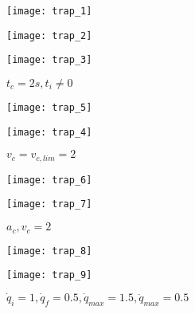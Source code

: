 \begin{figure}
\begin{minipage}{0.333\textwidth}
\centering
\texttt{[image: trap\_1]}
\caption{$t_c=2s$}
\label{fig:trap_1}
\end{minipage}
\begin{minipage}{0.333\textwidth}
\centering
\texttt{[image: trap\_2]}
\caption{$t_c=2s, q_i>q_f$}
\label{fig:trap_2}
\end{minipage}
\begin{minipage}{0.333\textwidth}
\centering
\texttt{[image: trap\_3]}
\caption{$t_c=2s, t_i\neq 0$}
\label{fig:trap_3}
\end{minipage}
\end{figure}

\begin{figure}
\begin{minipage}{0.5\textwidth}
\centering
\texttt{[image: trap\_5]}
\caption{$v_c=1.5$}
\label{fig:trap_5}
\end{minipage}
\begin{minipage}{0.5\textwidth}
\centering
\texttt{[image: trap\_4]}
\caption{$v_c=v_{c,lim}=2$}
\label{fig:trap_4}
\end{minipage}
\end{figure}

\begin{figure}
\begin{minipage}{0.5\textwidth}
\centering
\texttt{[image: trap\_6]}
\caption{$a_c=2$}
\label{fig:trap_6}
\end{minipage}
\begin{minipage}{0.5\textwidth}
\centering
\texttt{[image: trap\_7]}
\caption{$a_c,v_c=2$}
\label{fig:trap_7}
\end{minipage}
\end{figure}

\begin{figure}
\begin{minipage}{0.5\textwidth}
\centering
\texttt{[image: trap\_8]}
\caption{$\dot q_i=1,\dot q_f=0.5,\ddot q_{max}=0.5$}
\label{fig:trap_8}
\end{minipage}
\begin{minipage}{0.5\textwidth}
\centering
\texttt{[image: trap\_9]}
\caption{$\dot q_i=1,\dot q_f=0.5,\dot q_{max}=1.5,\ddot q_{max}=0.5$}
\label{fig:trap_9}
\end{minipage}
\end{figure}


